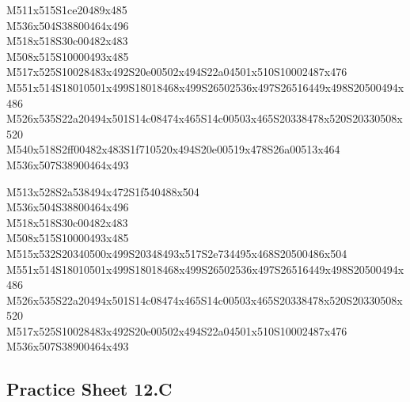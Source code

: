 \documentclass{article}
\begin{document}
\begin{multicols}{5}
\begin{center}
M511x515S1ce20489x485 %
\\M536x504S38800464x496 %
\\M518x518S30c00482x483 %
\\M508x515S10000493x485 %
\\M517x525S10028483x492S20e00502x494S22a04501x510S10002487x476 %
\\M551x514S18010501x499S18018468x499S26502536x497S26516449x498S20500494x486 %
\\M526x535S22a20494x501S14c08474x465S14c00503x465S20338478x520S20330508x520 %
\\M540x518S2ff00482x483S1f710520x494S20e00519x478S26a00513x464 %
\\M536x507S38900464x493 %
\vfil
\columnbreak

M513x528S2a538494x472S1f540488x504 %
\\M536x504S38800464x496 %
\\M518x518S30c00482x483 %
\\M508x515S10000493x485 %
\\M515x532S20340500x499S20348493x517S2e734495x468S20500486x504 %
\\M551x514S18010501x499S18018468x499S26502536x497S26516449x498S20500494x486 %
\\M526x535S22a20494x501S14c08474x465S14c00503x465S20338478x520S20330508x520 %
\\M517x525S10028483x492S20e00502x494S22a04501x510S10002487x476 %
\\M536x507S38900464x493 %
\vfil

\end{center}
\end{multicols}

\subsection{Practice Sheet 12.C}
\end{document}
